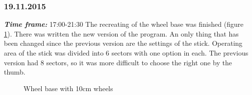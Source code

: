 \subsubsection{19.11.2015}
\textit{\textbf{Time frame:}} 17:00-21:30 \newline
The recreating of the wheel base was finished (figure \ref{Wheelbase1.2}). There was written the new version of the program. An only thing that has been changed since the previous version are the settings of the stick. Operating area of the stick was divided into 6 sectors with one option in each. The previous version had 8 sectors, so it was more difficult to choose the right one by the thumb.

\begin{figure}[H]
	\begin{minipage}[h]{1\linewidth}
		\caption{Wheel base with 10cm wheels}
		\label{Wheelbase1.2}
	\end{minipage}
\end{figure}

